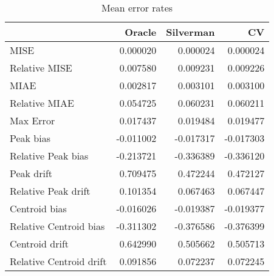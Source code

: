 \begin{table}[H]
\centering
\begin{tabular}{lrrr}
  \hline
 & Oracle & Silverman & CV \\ 
  \hline
MISE & 0.000020 & 0.000024 & 0.000024 \\ 
  Relative MISE & 0.007580 & 0.009231 & 0.009226 \\ 
  MIAE & 0.002817 & 0.003101 & 0.003100 \\ 
  Relative MIAE & 0.054725 & 0.060231 & 0.060211 \\ 
  Max Error & 0.017437 & 0.019484 & 0.019477 \\ 
  Peak bias & -0.011002 & -0.017317 & -0.017303 \\ 
  Relative Peak bias & -0.213721 & -0.336389 & -0.336120 \\ 
  Peak drift & 0.709475 & 0.472244 & 0.472127 \\ 
  Relative Peak drift & 0.101354 & 0.067463 & 0.067447 \\ 
  Centroid bias & -0.016026 & -0.019387 & -0.019377 \\ 
  Relative Centroid bias & -0.311302 & -0.376586 & -0.376399 \\ 
  Centroid drift & 0.642990 & 0.505662 & 0.505713 \\ 
  Relative Centroid drift & 0.091856 & 0.072237 & 0.072245 \\ 
   \hline
\end{tabular}
\caption{Mean error rates} 
\label{tbl:mean_error_rates}
\end{table}
